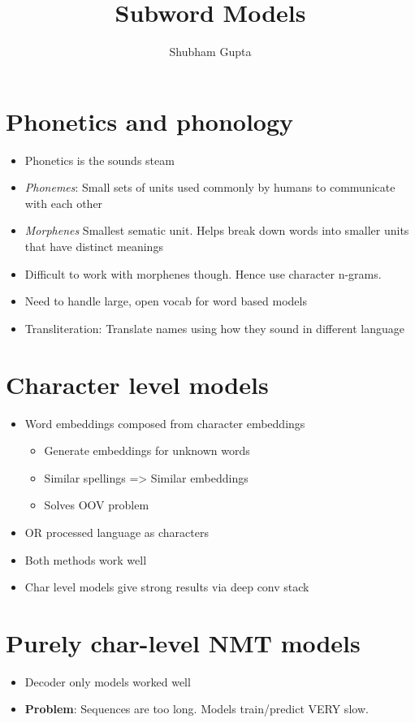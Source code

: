 \documentclass[a4paper]{article}
\title{Subword Models}
\author{Shubham Gupta}
\begin{document}
\maketitle
\section{Phonetics and phonology}
\begin{itemize}
    \item Phonetics is the sounds steam
    \item \textit{Phonemes}: Small sets of units used commonly by humans to communicate with each other
    \item \textit{Morphenes} Smallest sematic unit. Helps break down words into smaller units that have distinct meanings
    \item Difficult to work with morphenes though. Hence use character n-grams.
    \item Need to handle large, open vocab for word based models
    \item Transliteration: Translate names using how they sound in different language
\end{itemize}
\section{Character level models}
\begin{itemize}
    \item Word embeddings composed from character embeddings
        \begin{itemize}
            \item Generate embeddings for unknown words
            \item Similar spellings => Similar embeddings
            \item Solves OOV problem
        \end{itemize}
    \item OR processed language as characters
    \item Both methods work well
    \item Char level models give strong results via deep conv stack
\end{itemize}
\section{Purely char-level NMT models}
\begin{itemize}
    \item Decoder only models worked well
    \item \textbf{Problem}: Sequences are too long. Models train/predict VERY slow. 
\end{itemize}
\end{document}
